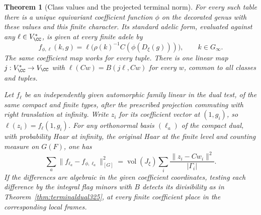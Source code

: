 \documentclass[a4paper,11pt]{article}
\newtheorem{theorem}[proposition]{Theorem}
\theoremstyle{definition}
\theoremstyle{remark}
\numberwithin{equation}{section}
\begin{document}
\begin{theorem}[Class values and the projected terminal norm]\leavevmode
\label{thm:terminalreading325}
For every such table there is a unique equivariant
coefficient function \(\phi\) on the decorated genus with
these values and this finite character. Its standard
adelic form, evaluated against any \(\ell\in V_\CC^*\),
is given at every finite adele by
\[
 f_{\phi,\ell}(k,g)
    =\ell\bigl(\rho(k)^{-1}C(\phi(D_\xi(g)))\bigr),
               \qquad k\in G_\infty .
\]
The same coefficient map works for every tuple. There is
one linear map \(j:V_\CC^*\to V_\CC\) with
\(\ell(Cw)=B(j\ell,Cw)\) for every \(w\), common
to all classes and tuples.

Let \(f_\ell\) be an independently given automorphic family
linear in the dual test, of the same compact and finite
types, after the prescribed projection commuting with right
translation at infinity. Write \(z_i\) for its coefficient
vector at \((1,g_i)\), so \(\ell(z_i)=f_\ell(1,g_i)\).
For any orthonormal basis \((\ell_a)\) of the compact dual,
with probability Haar at infinity, the original Haar at the
finite level and counting measure on \(G(F)\), one has
\[
 \sum_a\|f_{\ell_a}-f_{\phi,\ell_a}\|_{[G]}^2
    =\operatorname{vol}(J_\xi)\sum_i
              \frac{\|z_i-Cw_i\|^2}{|\Gamma_i|}.
\]
If the differences are algebraic in the given coefficient
coordinates, testing each difference by the integral flag
minors with \(B\) detects its divisibility as in
Theorem~\ref{thm:terminaldual325}, at every finite coefficient
place in the corresponding local frames.
\end{theorem}
\end{document}
